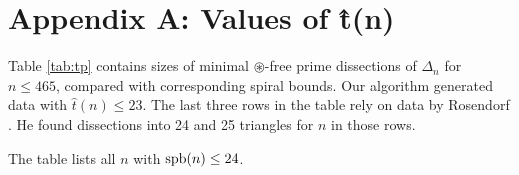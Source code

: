 \setcounter{chapter}{1}
\chapter*{Appendix A: Values of \^ t(n)}
\label{app:values-tn}

Table \ref{tab:tp} contains sizes of minimal $\circledast$-free prime dissections of $\Delta_n$ for $n \leq 465$, compared with corresponding spiral bounds. Our algorithm generated data with $\hat t(n) \leq 23$. The last three rows in the table rely on data by Rosendorf \cite{Rosendorf04}. He found dissections into 24 and 25 triangles for $n$ in those rows.

The table lists all $n$ with $\mathop{\mathrm{spb}}(n) \leq 24$.

